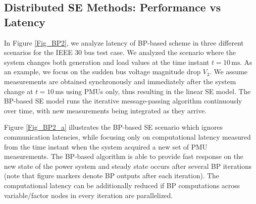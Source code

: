 \documentclass[journal]{IEEEtran}
\begin{document}
\subsection{Distributed SE Methods: Performance vs Latency}

In Figure \ref{Fig_BP2}, we analyze latency of BP-based scheme in three different scenarios for the IEEE 30 bus test case. We analyzed the scenario where the system changes both generation and load values at the time instant $t = 10\,\mathrm{ms}$. As an example, we focus on the sudden bus voltage magnitude drop $V_3$. We assume measurements are obtained synchronously and immediately after the system change at $t = 10\,\mathrm{ms}$ using PMUs only, thus resulting in the linear SE model. The BP-based SE model runs the iterative message-passing algorithm continuously over time, with new measurements being integrated as they arrive. 

Figure \ref{Fig_BP2_a} illustrates the BP-based SE scenario which ignores communication latencies, while focusing only on computational latency measured from the time instant when the system acquired a new set of PMU measurements. The BP-based algorithm is able to provide fast response on the new state of the power system and steady state occurs after several BP iterations (note that figure markers denote BP outputs after each iteration). The computational latency can be additionally reduced if BP computations across variable/factor nodes in every iteration are parallelized.
\end{document}
